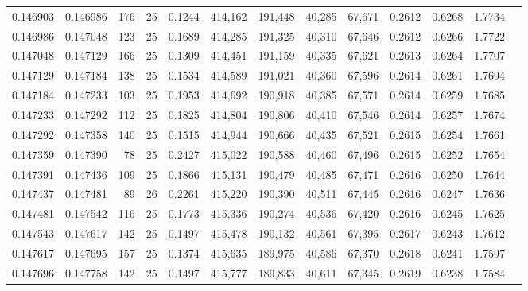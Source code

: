 \begin{tabular}{rrrrrrrrrrrrr}
0.146903 & 0.146986 &   176 &  25 &                                     0.1244 & 414,162 & 191,448 &  40,285 &  67,671 & 0.2612 & 0.6268 & 1.7734 \\
0.146986 & 0.147048 &   123 &  25 &                                     0.1689 & 414,285 & 191,325 &  40,310 &  67,646 & 0.2612 & 0.6266 & 1.7722 \\
0.147048 & 0.147129 &   166 &  25 &                                     0.1309 & 414,451 & 191,159 &  40,335 &  67,621 & 0.2613 & 0.6264 & 1.7707 \\
0.147129 & 0.147184 &   138 &  25 &                                     0.1534 & 414,589 & 191,021 &  40,360 &  67,596 & 0.2614 & 0.6261 & 1.7694 \\
0.147184 & 0.147233 &   103 &  25 &                                     0.1953 & 414,692 & 190,918 &  40,385 &  67,571 & 0.2614 & 0.6259 & 1.7685 \\
0.147233 & 0.147292 &   112 &  25 &                                     0.1825 & 414,804 & 190,806 &  40,410 &  67,546 & 0.2614 & 0.6257 & 1.7674 \\
0.147292 & 0.147358 &   140 &  25 &                                     0.1515 & 414,944 & 190,666 &  40,435 &  67,521 & 0.2615 & 0.6254 & 1.7661 \\
0.147359 & 0.147390 &    78 &  25 &                                     0.2427 & 415,022 & 190,588 &  40,460 &  67,496 & 0.2615 & 0.6252 & 1.7654 \\
0.147391 & 0.147436 &   109 &  25 &                                     0.1866 & 415,131 & 190,479 &  40,485 &  67,471 & 0.2616 & 0.6250 & 1.7644 \\
0.147437 & 0.147481 &    89 &  26 &                                     0.2261 & 415,220 & 190,390 &  40,511 &  67,445 & 0.2616 & 0.6247 & 1.7636 \\
0.147481 & 0.147542 &   116 &  25 &                                     0.1773 & 415,336 & 190,274 &  40,536 &  67,420 & 0.2616 & 0.6245 & 1.7625 \\
0.147543 & 0.147617 &   142 &  25 &                                     0.1497 & 415,478 & 190,132 &  40,561 &  67,395 & 0.2617 & 0.6243 & 1.7612 \\
0.147617 & 0.147695 &   157 &  25 &                                     0.1374 & 415,635 & 189,975 &  40,586 &  67,370 & 0.2618 & 0.6241 & 1.7597 \\
0.147696 & 0.147758 &   142 &  25 &                                     0.1497 & 415,777 & 189,833 &  40,611 &  67,345 & 0.2619 & 0.6238 & 1.7584 \\

\end{tabular}

